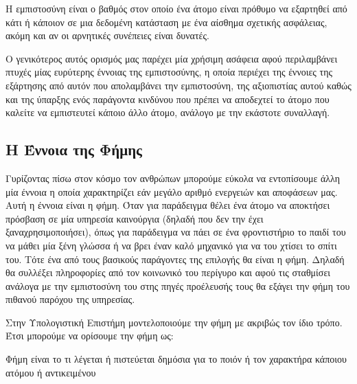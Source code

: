 \begin{decision}
Η εμπιστοσύνη είναι ο βαθμός στον οποίο ένα άτομο είναι πρόθυμο να εξαρτηθεί από κάτι ή κάποιον σε μια δεδομένη κατάσταση με ένα αίσθημα σχετικής ασφάλειας, ακόμη και αν οι αρνητικές συνέπειες είναι δυνατές.
\end{decision}

Ο γενικότερος αυτός ορισμός μας παρέχει μία χρήσιμη ασάφεια αφού περιλαμβάνει πτυχές μίας ευρύτερης έννοιας της εμπιστοσύνης, η οποία περιέχει της έννοιες της εξάρτησης από αυτόν που απολαμβάνει την εμπιστοσύνη, της αξιοπιστίας αυτού καθώς και της ύπαρξης ενός παράγοντα κινδύνου που πρέπει να αποδεχτεί το άτομο που καλείτε να εμπιστευτεί κάποιο άλλο άτομο, ανάλογο με την εκάστοτε συναλλαγή.

\subsection{Η Έννοια της Φήμης}

Γυρίζοντας πίσω στον κόσμο τον ανθρώπων μπορούμε εύκολα να εντοπίσουμε άλλη μία έννοια η οποία χαρακτηρίζει εάν μεγάλο αριθμό ενεργειών και αποφάσεων μας. Αυτή η έννοια είναι η φήμη. Όταν για παράδειγμα θέλει ένα άτομο να αποκτήσει πρόσβαση σε μία υπηρεσία καινούργια (δηλαδή που δεν την έχει ξαναχρησιμοποιήσει), όπως για παράδειγμα να πάει σε ένα φροντιστήριο το παιδί του να μάθει μία ξένη γλώσσα ή να βρει έναν καλό μηχανικό για να του χτίσει το σπίτι του. Τότε ένα από τους βασικούς παράγοντες της επιλογής θα είναι η φήμη. Δηλαδή θα συλλέξει πληροφορίες από τον κοινωνικό του περίγυρο και αφού τις σταθμίσει ανάλογα με την εμπιστοσύνη του στης πηγές προέλευσής τους θα εξάγει την φήμη του πιθανού παρόχου της υπηρεσίας.

Στην Υπολογιστική Επιστήμη μοντελοποιούμε την φήμη με ακριβώς τον ίδιο τρόπο. Έτσι μπορούμε να ορίσουμε την φήμη ως:
\begin{reputation}
Φήμη είναι το τι λέγεται ή πιστεύεται δημόσια για το ποιόν ή τον χαρακτήρα κάποιου ατόμου ή αντικειμένου
\end{reputation}